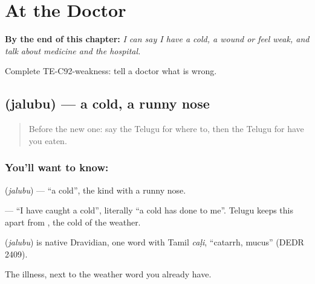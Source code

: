 
\chapter{At the Doctor}
\label{ch:te-at-the-doctor}

\begin{chapteropening}
\textbf{By the end of this chapter:} \emph{I can say I have a cold, a wound or feel weak, and talk about medicine and the hospital.}

Complete TE-C92-weakness: tell a doctor what is wrong.
\end{chapteropening}

\section[\texorpdfstring{\te{జలుబు} (jalubu)}{జలుబు (jalubu)}]{ (jalubu) — a cold, a runny nose}

\label{lesson:TE-C92-cold-illness}



\begin{quote}
Before the new one: say the Telugu for where to, then the Telugu for have you eaten.
\end{quote}

\subsection*{You'll want to know: }
\textbf{} (\emph{jalubu}) — \textquotedblleft{}a cold\textquotedblright{}, the kind with a runny nose.

\textbf{  } — \textquotedblleft{}I have caught a cold\textquotedblright{}, literally \textquotedblleft{}a cold has done to me\textquotedblright{}. Telugu keeps this apart from \textbf{}, the cold of the weather.

\begin{cousinweb}
\textbf{} (\emph{jalubu}) is native Dravidian, one word with Tamil \emph{caḷi}, \textquotedblleft{}catarrh, mucus\textquotedblright{} (DEDR 2409).
\end{cousinweb}

\begin{grammarlens}[title={What you've built}]
The illness, next to the weather word you already have.
\end{grammarlens}

